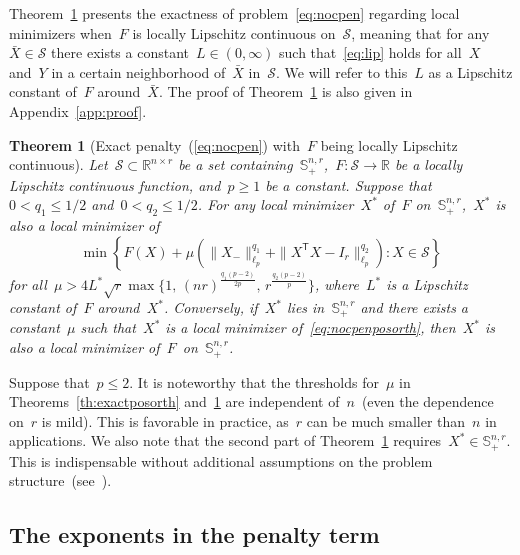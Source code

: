\documentclass[11pt,a4paper]{article}  %
\newtheorem{theorem}{Theorem}%
\theoremstyle{definition}
\newcommand{\RR}{\mathbb{R}}
\newcommand{\sset}{\mathcal{S}}
\newcommand{\penpar}{\mu}
\newcommand{\col}{r}
\newcommand{\stf}[1]{\mathbb{S}^{#1}}
\newcommand{\trs}{{\scriptstyle{\mathsf{T}}}}
\begin{document}
Theorem~\ref{th:lexactposorth} presents the exactness of problem~\eqref{eq:nocpen} regarding local minimizers
when~$F$ is locally Lipschitz continuous on~$\sset$, meaning that for any~$\bar{X} \in
\sset$ there exists a constant~$L\in(0,\infty)$ such that~\eqref{eq:lip} holds for all~$X$ and~$Y$
in a certain neighborhood of~$\bar{X}$ in~$\sset$. We will refer to
this~$L$ as a Lipschitz constant of~$F$ around~$\bar{X}$.
The proof of Theorem~\ref{th:lexactposorth} is also given in Appendix~\ref{app:proof}.
\begin{theorem}[Exact penalty~(\ref{eq:nocpen}) with~$F$ being locally Lipschitz continuous]
    \label{th:lexactposorth}
    Let~$\sset\subset\RR^{n\times\col}$ be a set containing~$\stf{n,\col}_+$,~$F\mathrel{:}\sset\to\RR$ be
    a locally Lipschitz continuous function, and~$p\ge 1$ be a constant.
    Suppose that~$0< q_1 \le 1/2$ and~$0 <q_2\le 1/2$.
    For any local minimizer~$X^*$ of~$F$ on~$\stf{n,\col}_+$,~$X^*$ is also a local minimizer of
    \begin{equation}
        \label{eq:nocpenposorth}
        \min \left\{ F(X) +  \penpar(\|X_{-}\|_{\ell_p}^{q_1} +\|X^\trs X - I_\col\|_{\ell_p} ^{q_2})
        \mathrel{:} X\in\sset \right\}
    \end{equation}
    for all~$\penpar > 4L^*\sqrt{\col}\max\Big\{1, \, (n\col)^{\frac{q_1(p-2)} {2p}}\!, \,
    \col^{\frac{q_2(p-2)}{p}}\Big\}$, where~$L^*$ is a Lipschitz constant of~$F$ around~$X^*$.
    Conversely, if~$X^*$ lies in~$\stf{n,\col}_+$ and
    there exists a constant~$\penpar$ such
    that~$X^*$ is a local minimizer of~\eqref{eq:nocpenposorth},
    then~$X^*$ is also a local minimizer of~$F$~on~$\stf{n,\col}_+$.%
\end{theorem}

Suppose that~$p \le 2$. It is noteworthy that the thresholds for~$\penpar$ in
Theorems~\ref{th:exactposorth} and~\ref{th:lexactposorth} are independent of~$n$~(even the dependence on~$\col$
is mild). This is favorable in practice, as~$\col$ can be much smaller than~$n$ in applications.
We also note that the second part of Theorem~\ref{th:lexactposorth} requires~$X^*\in\stf{n,\col}_+$.
This is indispensable without additional assumptions on the problem
structure~(see~\cite[Remark~9.1.1]{Cui_Pang_2021}).

\subsection{The exponents in the penalty term}\label{ssec:exponent}
\end{document}

